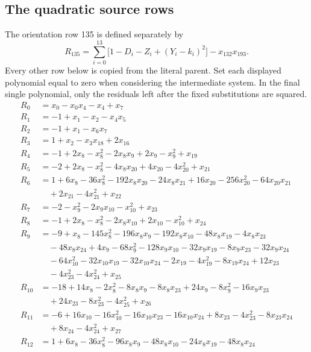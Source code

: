 \subsection{The quadratic source rows}
The orientation row 135 is defined separately by
\[
R_{135}=\sum_{i=0}^{13}\bigl[1-D_i-Z_i+(Y_i-k_i)^2\bigr]-x_{132}x_{193}.
\]
Every other row below is copied from the literal parent. Set each displayed polynomial equal to zero when considering the intermediate system. In the final single polynomial, only the residuals left after the fixed substitutions are squared.
\begingroup\small
\begin{align*}
R_{0}&=x_{0}-x_{0}x_{4}-x_{4}+x_{7}\\[2pt]
R_{1}&=-1+x_{1}-x_{2}-x_{4}x_{5}\\[2pt]
R_{2}&=-1+x_{1}-x_{6}x_{7}\\[2pt]
R_{3}&=1+x_{2}-x_{3}x_{18}+2x_{16}\\[2pt]
R_{4}&=-1+2x_{8}-x_{8}^{2}-2x_{8}x_{9}+2x_{9}-x_{9}^{2}+x_{19}\\[2pt]
R_{5}&=-2+2x_{8}-x_{8}^{2}-4x_{8}x_{20}+4x_{20}-4x_{20}^{2}+x_{21}\\[2pt]
R_{6}&=1+6x_{8}-36x_{8}^{2}-192x_{8}x_{20}-24x_{8}x_{21}+16x_{20}-256x_{20}^{2}-64x_{20}x_{21}\\
&\quad +2x_{21}-4x_{21}^{2}+x_{22}\\[2pt]
R_{7}&=-2-x_{9}^{2}-2x_{9}x_{10}-x_{10}^{2}+x_{23}\\[2pt]
R_{8}&=-1+2x_{8}-x_{8}^{2}-2x_{8}x_{10}+2x_{10}-x_{10}^{2}+x_{24}\\[2pt]
R_{9}&=-9+x_{8}-145x_{8}^{2}-196x_{8}x_{9}-192x_{8}x_{10}-48x_{8}x_{19}-4x_{8}x_{23}\\
&\quad -48x_{8}x_{24}+4x_{9}-68x_{9}^{2}-128x_{9}x_{10}-32x_{9}x_{19}-8x_{9}x_{23}-32x_{9}x_{24}\\
&\quad -64x_{10}^{2}-32x_{10}x_{19}-32x_{10}x_{24}-2x_{19}-4x_{19}^{2}-8x_{19}x_{24}+12x_{23}\\
&\quad -4x_{23}^{2}-4x_{24}^{2}+x_{25}\\[2pt]
R_{10}&=-18+14x_{8}-2x_{8}^{2}-8x_{8}x_{9}-8x_{8}x_{23}+24x_{9}-8x_{9}^{2}-16x_{9}x_{23}\\
&\quad +24x_{23}-8x_{23}^{2}-4x_{25}^{2}+x_{26}\\[2pt]
R_{11}&=-6+16x_{10}-16x_{10}^{2}-16x_{10}x_{23}-16x_{10}x_{24}+8x_{23}-4x_{23}^{2}-8x_{23}x_{24}\\
&\quad +8x_{24}-4x_{24}^{2}+x_{27}\\[2pt]
R_{12}&=1+6x_{8}-36x_{8}^{2}-96x_{8}x_{9}-48x_{8}x_{10}-24x_{8}x_{19}-48x_{8}x_{24}\\

\end{align*}
